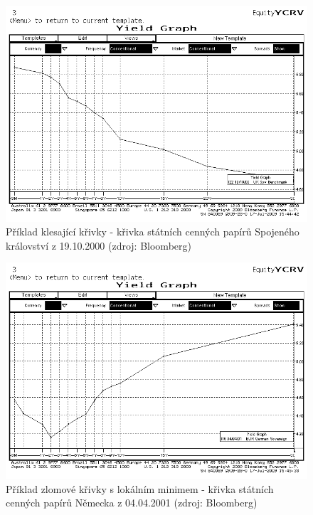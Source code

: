 \documentclass[a4paper]{book}
\begin{document}
\begin{figure}
  \includegraphics[bb=0 0 350 250]{curve_decreasing.bmp}
  \caption{Příklad klesající křivky - křivka státních cenných papírů Spojeného království z 19.10.2000 (zdroj: Bloomberg)}
  \label{curve_decreasing}
\end{figure}
\begin{figure}
  \includegraphics[bb=0 0 350 250]{curve_humped_min.bmp}
  \caption{Příklad zlomové křivky s lokálním minimem - křivka státních cenných papírů Německa z 04.04.2001 (zdroj: Bloomberg)}
  \label{curve_humped_min}
\end{figure}
\end{document}
